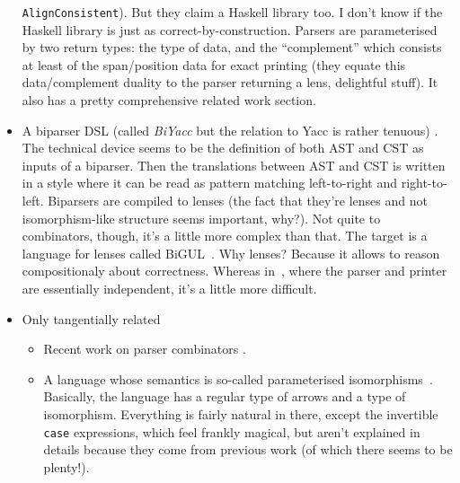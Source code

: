 \documentclass[sigplan,review,dvipsnames,screen,10pt]{acmart}
\begin{document}
\begin{itemize}
  \verb+AlignConsistent+). But they claim a Haskell library too. I
  don't know if the Haskell library is just as
  correct-by-construction. Parsers are parameterised by two return
  types: the type of data, and the “complement” which consists at
  least of the span/position data for exact printing (they equate this
  data/complement duality to the parser returning a lens, delightful
  stuff). It also has a pretty comprehensive related work section.
\item A biparser DSL (called \emph{BiYacc} but the relation to Yacc is
  rather tenuous) \cite{biyacc}. The technical device seems to be the
  definition of both AST and CST as inputs of a biparser. Then the
  translations between AST and CST is written in a style where it can
  be read as pattern matching left-to-right and
  right-to-left. Biparsers are compiled to lenses (the fact that
  they're lenses and not isomorphism-like structure seems important,
  why?). Not quite to combinators, though, it's a little more complex
  than that. The target is a language for lenses called
  BiGUL~\cite{bigul}. Why lenses? Because it allows to reason
  compositionaly about correctness. Whereas
  in~\cite{monadic-profunctors}, where the parser and printer are
  essentially independent, it's a little more difficult.
\item Only tangentially related
  \begin{itemize}
  \item Recent work on parser combinators
    \cite{parsley,parsec-design-patterns}.
  \item A language whose semantics is so-called parameterised
    isomorphisms~\cite{parameterised-isomorphism}. Basically, the
    language has a regular type of arrows and a type of
    isomorphism. Everything is fairly natural in there, except the
    invertible \verb+case+ expressions, which feel frankly magical,
    but aren't explained in details because they come from previous
    work (of which there seems to be plenty!).
  \end{itemize}
\end{itemize}


{}
\end{document}
